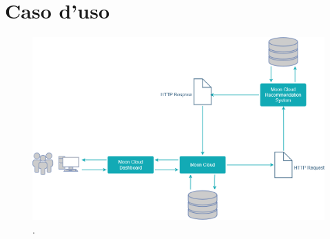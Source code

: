 \chapter{Caso d'uso}\label{chp:05-usecase}
\begin{figure}[ht!]
    \centering
    \includegraphics[scale=0.38]{images/UML_MoonCloud_HowToDo.png}
    \caption{.}
    \label{fig:UML_MoonCloud_HowToDo}
\end{figure}
%